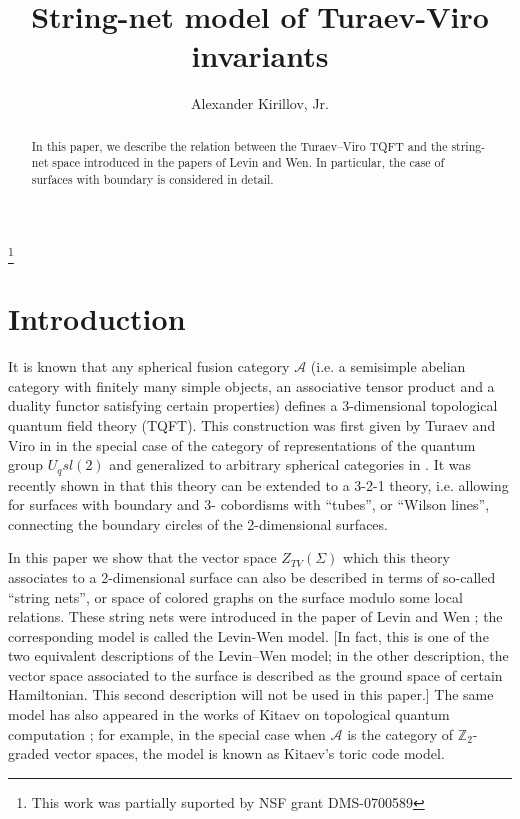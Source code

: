 \documentclass{amsart}
\theoremstyle{definition}
\theoremstyle{remark}
\numberwithin{equation}{section}
\newcommand{\<}{\langle}
\renewcommand{\>}{\rangle}
\newcommand{\Z}{\mathbb{Z}}       %
\newcommand{\A}{\mathcal{A}}      %
\newcommand{\Si}{\Sigma}
\begin{document}
\title{String-net model of Turaev-Viro invariants}

\author{Alexander Kirillov, Jr.}
   \address{Department of Mathematics, SUNY at Stony Brook, 
            Stony Brook, NY 11794, USA}

\thanks{This  work was partially suported by NSF grant DMS-0700589 }

\begin{abstract}
In this paper, we describe the relation between the Turaev--Viro TQFT and the
string-net space introduced in the papers of Levin and Wen. In particular,
the case of surfaces with boundary is considered in detail.    
\end{abstract}

\maketitle
\section*{Introduction}
It is known that any spherical fusion  category $\A$ (i.e. a semisimple abelian 
category with finitely many simple objects, an associative tensor product 
and a duality functor satisfying certain properties) defines a 
3-dimensional  topological quantum field theory (TQFT). This construction 
was first  given by Turaev and Viro in  in the special case of 
the category of representations of the quantum group $U_q sl(2)$ and 
generalized to arbitrary spherical categories in . It was 
recently shown in   that this theory can be extended 
to a 3-2-1 theory, i.e. allowing for surfaces with boundary and 3-
cobordisms with ``tubes'', or ``Wilson lines'', connecting the boundary 
circles of the 2-dimensional surfaces. 

In this paper we show that the vector space $Z_{TV}(\Si)$ which this theory 
associates  to a 2-dimensional surface can also be described in terms of 
so-called ``string  nets'', or space of colored graphs on the surface 
modulo some local relations. These  string nets were introduced in the 
paper of Levin and Wen ; the  corresponding 
model is called the Levin-Wen model. [In fact, this is one of the two 
equivalent descriptions of the Levin--Wen model; in the other description, 
the vector space associated to the surface is described as the ground space 
of certain Hamiltonian. This second description will not be used in this 
paper.] The same model has also  appeared in the works of Kitaev on 
topological quantum computation ; for 
example, in the special case when $\A$ is the category of $\Z_2$-graded 
vector spaces, the model is known as Kitaev's toric code model.  
\end{document}
